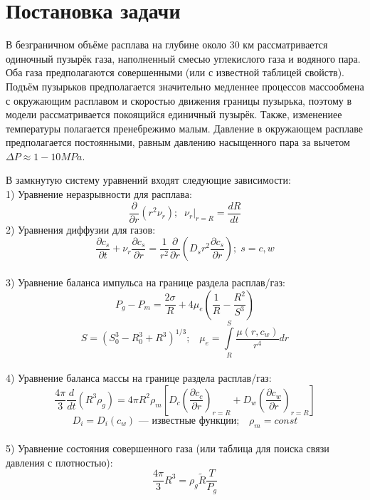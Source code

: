 \section{Постановка задачи}
\par В безграничном объёме расплава на глубине около 30 км рассматривается одиночный пузырёк газа, наполненный смесью углекислого газа и водяного пара. Оба газа предполагаются совершенными (или с известной таблицей свойств). Подъём пузырьков предполагается значительно медленнее процессов массообмена с окружающим расплавом и скоростью движения границы пузырька, поэтому в модели рассматривается покоящийся единичный пузырёк. Также, изменениее температуры полагается пренебрежимо малым. Давление в окружающем расплаве предполагается постоянными, равным давлению насыщенного пара за вычетом $\Delta P\approx 1-10 MPa$.\\
\par В замкнутую систему уравнений входят следующие зависимости:\\
1) Уравнение неразрывности для расплава:\\
$$\frac{\partial}{\partial r}\left(r^{2}\nu_{r}\right);\;\; \left.\nu_{r}\right|_{r=R}=\frac{dR}{dt}$$
2) Уравнения диффузии для газов:\\
$$\frac{\partial c_{s}}{\partial t}+\nu_{r} \frac{\partial c_{s}}{\partial r}=\frac{1}{r^{2}}\frac{\partial}{\partial r}(D_{s}r^{2}\frac{\partial c_{s}}{\partial r});\; s=c, w$$\\
3) Уравнение баланса импульса на границе раздела расплав/газ:\\
$$P_{g}-P_{m}=\frac{2 \sigma}{R}+4\mu_{e}(\frac{1}{R}-\frac{R^{2}}{S^{3}})$$
$$S = (S_{0}^{3}-R_{0}^{3}+R^{3})^{1/3};\;\;\;\mu_{e}=\int\limits^{S}_{R}\frac{\mu(r,c_{w})}{r^{4}}dr$$\\
4) Уравнение баланса массы на границе раздела расплав/газ:\\
$$\frac{4\pi}{3}\frac{d}{dt}(R^3\rho_{g})=4\pi R^{2}\rho_{m}[D_{c}(\frac{\partial c_{c}}{\partial r})_{r=R}+D_{w}(\frac{\partial c_{w}}{\partial r})_{r=R}]$$
$$D_{i}=D_{i}(c_{w})\text{ --- известные функции};\;\;\;\rho_{m}=const$$\\
5) Уравнение состояния совершенного газа (или таблица для поиска связи давления с плотностью):\\
$$\frac{4\pi}{3}R^{3}=\rho_{g} \tilde{R}\frac{T}{P_{g}}$$